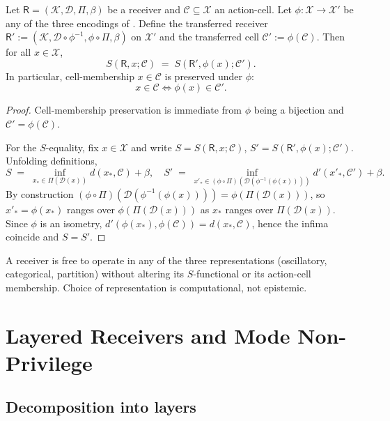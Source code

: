 \documentclass[twocolumn,11pt,a4paper]{article}
\newcommand{\K}{\mathcal{K}}
\newcommand{\D}{\mathcal{D}}
\newcommand{\X}{\mathcal{X}}
\newcommand{\Cell}{\mathcal{C}}
\newcommand{\receiver}{\mathsf{R}}
\begin{document}
\begin{theorem}\label{thm:rep-inv}
Let $\receiver=(\K,\D,\Pi,\beta)$ be a receiver and $\Cell\subseteq\X$ an
action-cell. Let $\phi:\X\to\X'$ be any of the three encodings of
. Define the transferred receiver
$\receiver':=(\K,\D\circ\phi^{-1},\phi\circ\Pi,\beta)$ on $\X'$ and the
transferred cell $\Cell':=\phi(\Cell)$. Then for all $x\in\X$,
\[
S(\receiver,x;\Cell)\;=\;S(\receiver',\phi(x);\Cell').
\]
In particular, cell-membership $x\in\Cell$ is preserved under $\phi$:
\[
x\in\Cell \iff \phi(x)\in\Cell'.
\]
\end{theorem}

\begin{proof}
Cell-membership preservation is immediate from $\phi$ being a bijection and
$\Cell'=\phi(\Cell)$.

For the $S$-equality, fix $x\in\X$ and write $S=S(\receiver,x;\Cell)$,
$S'=S(\receiver',\phi(x);\Cell')$. Unfolding definitions,
\[
S\;=\;\inf_{x_*\in\Pi(\D(x))}d(x_*,\Cell)+\beta,
\quad
S'\;=\;\inf_{x'_*\in(\phi\circ\Pi)(\D(\phi^{-1}(\phi(x))))}d'(x'_*,\Cell')+\beta.
\]
By construction $(\phi\circ\Pi)(\D(\phi^{-1}(\phi(x))))=\phi(\Pi(\D(x)))$,
so $x'_*=\phi(x_*)$ ranges over $\phi(\Pi(\D(x)))$ as $x_*$ ranges over
$\Pi(\D(x))$. Since $\phi$ is an isometry,
$d'(\phi(x_*),\phi(\Cell))=d(x_*,\Cell)$, hence the infima coincide and
$S=S'$.
\end{proof}

\begin{corollary}\label{cor:triple}
A receiver is free to operate in any of the three representations
(oscillatory, categorical, partition) without altering its $S$-functional
or its action-cell membership. Choice of representation is computational,
not epistemic.
\end{corollary}

\section{Layered Receivers and Mode Non-Privilege}
\label{sec:layered}

\subsection{Decomposition into layers}
\end{document}
